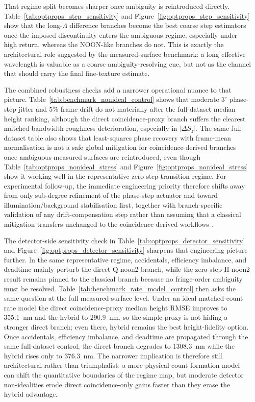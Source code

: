 \documentclass[photonics,article,submit,pdftex,moreauthors]{Definitions/mdpi}
\begin{document}
That regime split becomes sharper once ambiguity is reintroduced directly. Table~\ref{tab:optprops_step_sensitivity} and Figure~\ref{fig:optprops_step_sensitivity} show that the long-$\Lambda$ difference branches become the best coarse step estimators once the imposed discontinuity enters the ambiguous regime, especially under high return, whereas the NOON-like branches do not. This is exactly the architectural role suggested by the measured-surface benchmark: a long effective wavelength is valuable as a coarse ambiguity-resolving cue, but not as the channel that should carry the final fine-texture estimate.

The combined robustness checks add a narrower operational nuance to that picture. Table~\ref{tab:benchmark_nonideal_control} shows that moderate $3^\circ$ phase-step jitter and $5\%$ frame drift do not materially alter the full-dataset median height ranking, although the direct coincidence-proxy branch suffers the clearest matched-bandwidth roughness deterioration, especially in $|\Delta S_z|$. The same full-dataset table also shows that least-squares phase recovery with frame-mean normalisation is not a safe global mitigation for coincidence-derived branches once ambiguous measured surfaces are reintroduced, even though Table~\ref{tab:optprops_nonideal_stress} and Figure~\ref{fig:optprops_nonideal_stress} show it working well in the representative zero-step transition regime. For experimental follow-up, the immediate engineering priority therefore shifts away from only sub-degree refinement of the phase-step actuator and toward illumination/background stabilisation first, together with branch-specific validation of any drift-compensation step rather than assuming that a classical mitigation transfers unchanged to the coincidence-derived workflows \cite{McDonnell2020,Ri2020,Medina2014,Kim2026}.

The detector-side sensitivity check in Table~\ref{tab:optprops_detector_sensitivity} and Figure~\ref{fig:optprops_detector_sensitivity} sharpens that engineering picture further. In the same representative regime, accidentals, efficiency imbalance, and deadtime mainly perturb the direct Q-noon2 branch, while the zero-step H-noon2 result remains pinned to the classical branch because no fringe-order ambiguity must be resolved. Table~\ref{tab:benchmark_rate_model_control} then asks the same question at the full measured-surface level. Under an ideal matched-count rate model the direct coincidence-proxy median height RMSE improves to 355.1~nm and the hybrid to 290.9~nm, so the simple proxy is not hiding a stronger direct branch; even there, hybrid remains the best height-fidelity option. Once accidentals, efficiency imbalance, and deadtime are propagated through the same full-dataset control, the direct branch degrades to 1308.3~nm while the hybrid rises only to 376.3~nm. The narrower implication is therefore still architectural rather than triumphalist: a more physical count-formation model can shift the quantitative boundaries of the regime map, but moderate detector non-idealities erode direct coincidence-only gains faster than they erase the hybrid advantage.
\end{document}

